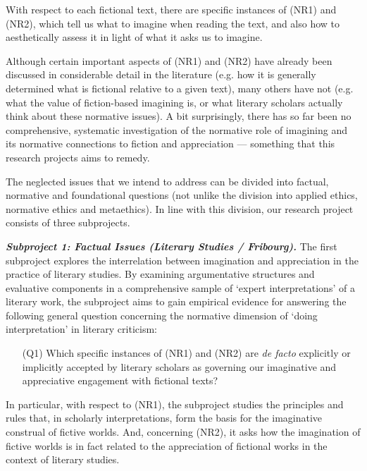 \noindent With respect to each fictional text, there are specific instances of (NR1) and (NR2), which tell us what to imagine when reading the text, and also how to aesthetically assess it in light of what it asks us to imagine.

Although certain important aspects of (NR1) and (NR2) have already been discussed in considerable detail in the literature (e.g. how it is generally determined what is fictional relative to a given text), many others have not (e.g. what the value of fiction-based imagining is, or what literary scholars actually think about these normative issues). A bit surprisingly, there has so far been no comprehensive, systematic investigation of the normative role of imagining and its normative connections to fiction and appreciation --- something that this research projects aims to remedy. 

The neglected issues that we intend to address can be divided into factual, normative and foundational questions (not unlike the division into applied ethics, normative ethics and metaethics). In line with this division, our research project consists of three subprojects.

\vspace{.2cm}
\noindent\textbf{\emph{Subproject 1: Factual Issues (Literary Studies / Fribourg).}} The first subproject explores the interrelation between imagination and appreciation in the practice of literary studies. By examining argumentative structures and evaluative components in a comprehensive sample of `expert interpretations' of a literary work, the subproject aims to gain empirical evidence for answering the following general question concerning the normative dimension of `doing interpretation' in literary criticism:

\vspace{-.1cm}
\begin{itemize}[leftmargin=2cm]
\item[(Q1)] Which specific instances of (NR1) and (NR2) are \emph{de facto} explicitly or implicitly accepted by literary scholars as governing our imaginative and appreciative engagement with fictional texts?
\end{itemize}
\vspace{-.1cm}

\noindent In particular, with respect to (NR1), the subproject studies the principles and rules that, in scholarly interpretations, form the basis for the imaginative construal of fictive worlds. And, concerning (NR2), it asks how the imagination of fictive worlds is in fact related to the appreciation of fictional works in the context of literary studies.


